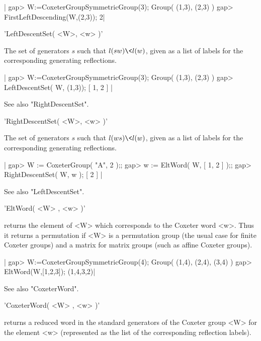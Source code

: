 |    gap> W:=CoxeterGroupSymmetricGroup(3);
    Group( (1,3), (2,3) )
    gap> FirstLeftDescending(W,(2,3));
    2|


'LeftDescentSet( <W>, <w> )'

The set of generators $s$ such that $l(sw)\<l(w)$, given  as  a  list  of
labels for the corresponding generating reflections.

|    gap> W:=CoxeterGroupSymmetricGroup(3);
     Group( (1,3), (2,3) )
    gap> LeftDescentSet( W, (1,3));
    [ 1, 2 ] |

See also "RightDescentSet".


'RightDescentSet( <W>, <w> )'

The set of generators $s$ such that $l(ws)\< l(w)$, given as  a  list  of
labels for the corresponding generating reflections.

|    gap> W := CoxeterGroup( "A", 2 );;
    gap> w := EltWord( W, [ 1, 2 ] );;
    gap> RightDescentSet( W, w );
    [ 2 ] |

See also "LeftDescentSet".



'EltWord( <W> , <w> )'

returns  the element of <W> which corresponds to the Coxeter word <w>. Thus
it  returns a permutation if <W> is a permutation group (the usual case for
finite  Coxeter  groups)  and  a  matrix  for matrix groups (such as affine
Coxeter  groups).

|    gap> W:=CoxeterGroupSymmetricGroup(4);
    Group( (1,4), (2,4), (3,4) )
    gap> EltWord(W,[1,2,3]);
    (1,4,3,2)|

See also "CoxeterWord".


'CoxeterWord( <W> , <w> )'

returns a reduced  word in the standard generators of  the Coxeter group
<W>  for  the  element  <w>  (represented as  the  {\GAP}  list  of  the
corresponding reflection labels).

